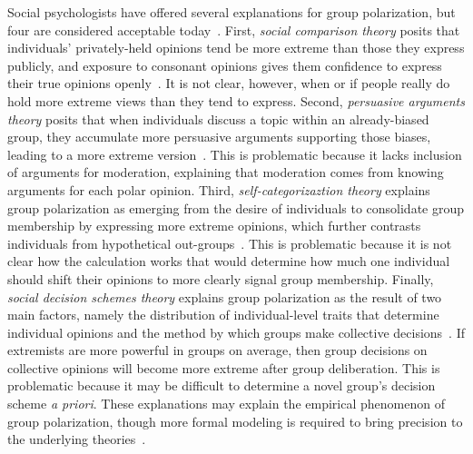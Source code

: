 Social psychologists have offered several explanations for group polarization, 
but four are considered acceptable today~\cite{Sieber2019}. 
First, \emph{social comparison theory} posits that individuals' privately-held 
opinions tend be more extreme than those they express publicly, and exposure to consonant 
opinions gives them confidence to express their true opinions openly~\cite{Myers1982}. 
It is not clear, however, when or if people really do hold more extreme views
than they tend to express.
Second, \emph{persuasive arguments theory} posits that when individuals discuss a topic within an already-biased group, 
they accumulate more persuasive arguments supporting those biases, leading to a more extreme version~\cite{Bishop1974,Vinokur1974}. 
This is problematic because it lacks inclusion of arguments for moderation, explaining that
moderation comes from knowing arguments for each polar opinion.
Third, \emph{self-categorizaztion theory} explains group polarization as emerging from
the desire of individuals to consolidate group membership by expressing more
extreme opinions, which further contrasts individuals from hypothetical out-groups~\cite{Turner1987,Abrams1990,McGarty1992}.
This is problematic because it is not clear how the calculation works that
would determine how much one individual should shift their opinions to more clearly
signal group membership.
Finally, \emph{social decision schemes theory} explains group polarization as the 
result of two main factors, namely the distribution of individual-level traits
that determine individual opinions and the method by which groups make collective decisions~\cite{Zuber1992,Friedkin1999a}.
If extremists are more powerful in groups on average, then group decisions
on collective opinions will become more extreme after group deliberation.
This is problematic because it may be difficult to determine a novel group's
decision scheme \emph{a priori}.
These explanations may explain the empirical phenomenon of group polarization, 
though more formal modeling is required to bring precision to the underlying 
theories~\cite{Smaldino2017StupidModels,Smaldino2019b}. 

